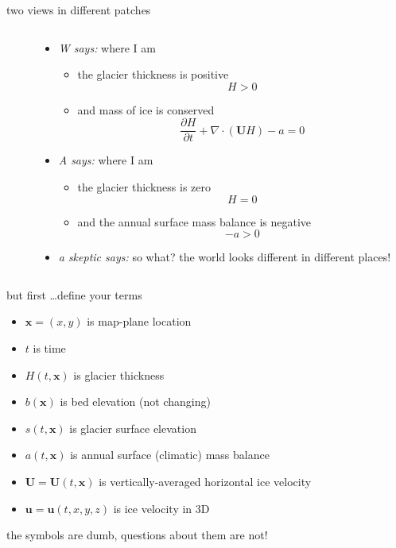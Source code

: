 \documentclass[10pt,hyperref,dvipsnames]{beamer}
\newcommand{\bx}{\mathbf{x}}
\newcommand{\bu}{\mathbf{u}}
\newcommand{\bU}{\mathbf{U}}
\newcommand{\Div}{\nabla\cdot}
\begin{document}
\begin{frame}{two views in different patches}
\begin{columns}
\begin{column}{0.25\textwidth}
\bigskip

\bigskip
\end{column}
\begin{column}{0.75\textwidth}
\begin{itemize}
\item \emph{W says:} where I am
    \begin{itemize}
    \item[] the glacier thickness is positive
        $$H>0$$
    \item[] and mass of ice is conserved
        $$\frac{\partial H}{\partial t} + \Div \left(\bU H\right) - a = 0$$
    \end{itemize}
\item \emph{A says:} where I am
    \begin{itemize}
    \item[] the glacier thickness is zero
        $$H=0$$
    \item[] and the annual surface mass balance is negative
        $$-a > 0$$
    \end{itemize}

\medskip
\item<2> \emph{a skeptic says:} so what?  the world looks different in different places!
\end{itemize}
\end{column}
\end{columns}
\end{frame}


\begin{frame}{but first \dots define your terms}
\begin{itemize}
\item $\bx = (x,y)$ is map-plane location
\item $t$ is time

\medskip
\item $H(t,\bx)$ is glacier thickness
\item $b(\bx)$ is bed elevation (not changing)
\item $s(t,\bx)$ is glacier surface elevation
\item $a(t,\bx)$ is annual surface (climatic) mass balance
\item $\bU = \bU(t,\bx)$ is vertically-averaged horizontal ice velocity
\item $\bu = \bu(t,x,y,z)$ is ice velocity in 3D
\end{itemize}

\vspace{25mm}

\footnotesize
\alert{the symbols are dumb, questions about them are not!}
\end{frame}
\end{document}
